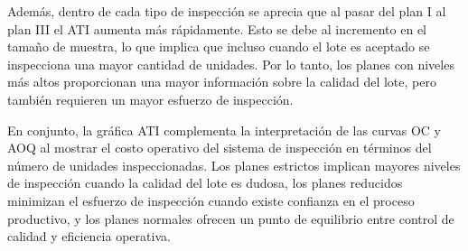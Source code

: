 \documentclass[
  12pt,
]{article}
\begin{document}
Además, dentro de cada tipo de inspección se aprecia que al pasar del
plan I al plan III el ATI aumenta más rápidamente. Esto se debe al
incremento en el tamaño de muestra, lo que implica que incluso cuando el
lote es aceptado se inspecciona una mayor cantidad de unidades. Por lo
tanto, los planes con niveles más altos proporcionan una mayor
información sobre la calidad del lote, pero también requieren un mayor
esfuerzo de inspección.

En conjunto, la gráfica ATI complementa la interpretación de las curvas
OC y AOQ al mostrar el costo operativo del sistema de inspección en
términos del número de unidades inspeccionadas. Los planes estrictos
implican mayores niveles de inspección cuando la calidad del lote es
dudosa, los planes reducidos minimizan el esfuerzo de inspección cuando
existe confianza en el proceso productivo, y los planes normales ofrecen
un punto de equilibrio entre control de calidad y eficiencia operativa.
\end{document}
